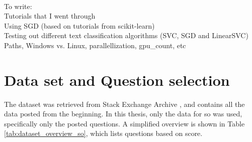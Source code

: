 \begin{comment}
Potentially move "all this failed and went wrong" here
\end{comment}

~\\
To write: \\
Tutorials that I went through \\
Using SGD (based on tutorials from scikit-learn) \\
Testing out different text classification algorithms (SVC, SGD and LinearSVC) \\
Paths, Windows vs. Linux, parallellization, gpu\_count, etc

\section{Data set and Question selection}
\label{sec:data_and_testing}
The dataset was retrieved from Stack Exchange Archive \cite{StackExchange2016}, and contains all the data posted from the beginning. 
In this thesis, only the data for \gls{so} was used, specifically only the posted questions.
A simplified overview is shown in Table \ref{tab:dataset_overview_so}, which lists questions based on score. 

